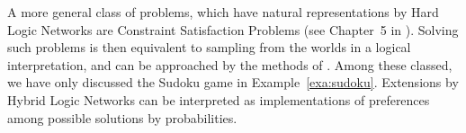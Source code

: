 A more general class of problems, which have natural representations by Hard Logic Networks are Constraint Satisfaction Problems (see Chapter~5 in \cite{russell_artificial_2021}).
Solving such problems is then equivalent to sampling from the worlds in a logical interpretation, and can be approached by the methods of .
Among these classed, we have only discussed the Sudoku game in Example~\ref{exa:sudoku}.
Extensions by Hybrid Logic Networks can be interpreted as implementations of preferences among possible solutions by probabilities.




